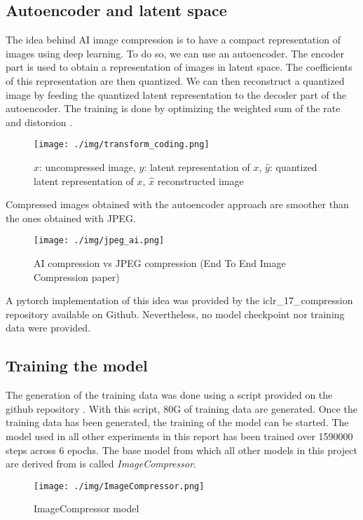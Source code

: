\documentclass[12pt]{article}
\begin{document}
\subsection{Autoencoder and latent space}
The idea behind AI image compression is to have a compact representation of images using deep learning. To do so, we can use an autoencoder. The encoder part is used to obtain a representation of images in latent space. The coefficients of this representation are then quantized. We can then reconstruct a quantized image by feeding the quantized latent representation to the decoder part of the autoencoder. The training is done by optimizing the weighted sum of the rate and distorsion \autocite{balleEndtoendOptimizedImage2017}.
\begin{figure}[H]
    \centering
    \texttt{[image: ./img/transform\_coding.png]}
    \caption[Representation of images]{$x$: uncompressed image, $y$: latent representation of $x$, $\hat{y}$: quantized latent representation of $x$, $\hat{x}$ reconstructed image}
\end{figure}
Compressed images obtained with the autoencoder approach are smoother than the ones obtained with JPEG.
\begin{figure}
    \centering
    \texttt{[image: ./img/jpeg\_ai.png]}
    \caption[AI compression vs JPEG]{AI compression vs JPEG compression (End To End Image Compression paper)}
\end{figure}

A pytorch implementation of this idea was provided by the iclr\_17\_compression repository \autocite{LiujiahengIclr_17_compressionEndtoend} available on Github. Nevertheless, no model checkpoint nor training data were provided.


\subsection{Training the model}
The generation of the training data was done using a script provided on the github repository \autocite{LiujiahengIclr_17_compressionEndtoend}. With this script, 80G of training data are generated. Once the training data has been generated, the training of the model can be started. The model used in all other experiments in this report has been trained over 1590000 steps across 6 epochs. The base model from which all other models in this project are derived from is called \textit{ImageCompressor}.
\begin{figure}[H]
    \centering
    \texttt{[image: ./img/ImageCompressor.png]}
    \caption[ImageCompressor model]{ImageCompressor model}
\end{figure}
\end{document}
